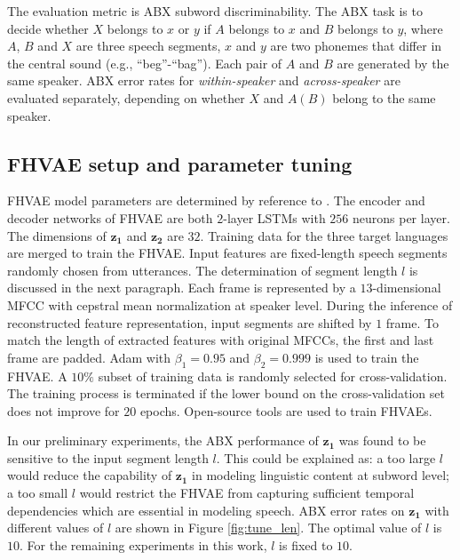 \documentclass[a4paper]{article}
\newcommand{\quotes}[1]{``#1''}
\begin{document}
The evaluation metric is ABX subword discriminability. The ABX task is to decide whether $X$ belongs to $x$ or $y$ if $A$ belongs to $x$ and $B$ belongs to $y$, where $A$, $B$ and $X$ are three speech segments, $x$ and $y$ are two phonemes that differ in the central sound (e.g., \quotes{beg}-\quotes{bag}). 
Each pair of $A$ and $B$ are generated by the same speaker. 
ABX error rates for \textit{within-speaker} and \textit{across-speaker} are evaluated separately, depending on whether $X$ and $A(B)$ belong to the same speaker. 
\subsection{FHVAE setup and parameter tuning}
FHVAE model parameters are determined by reference to  \cite{hsu2018extracting}. The  encoder and decoder networks of FHVAE are both $2$-layer LSTMs with $256$ neurons per layer. The dimensions of  $\bm{z_1}$ and $\bm{z_2}$ are $32$. 
Training data for the three target languages are merged to train the FHVAE. 
Input features  are fixed-length speech segments randomly chosen from utterances. The determination of segment length $l$ is discussed in the next paragraph. Each frame is represented by a $13$-dimensional MFCC with cepstral mean normalization at speaker level. 
During the inference of reconstructed feature representation, input segments are shifted by $1$ frame. To match the length of extracted features with original MFCCs, the first and last frame are padded. 
Adam \cite{kingma2014adam} with $\beta_1=0.95$ and $\beta_2=0.999$  is used to train the FHVAE. A $10\%$ subset of training data is randomly selected for cross-validation.
The training process is terminated if the lower bound on the cross-validation set does not improve for $20$ epochs. Open-source tools \cite{hsu2017nips} are used to train FHVAEs.

In our preliminary experiments, the ABX performance of $\bm{z_1}$ was found to be sensitive to the input segment length $l$. 
This could be explained as:  a too large  $l$ would reduce  the capability of $\bm{z_1}$ in modeling linguistic content at  subword level; 
a too small $l$ would restrict the FHVAE from capturing sufficient temporal dependencies which are essential in modeling speech.  ABX error rates on $\bm{z_1}$ with different values of $l$   are shown in Figure \ref{fig:tune_len}. 
The optimal value of $l$ is $10$. For the remaining experiments in this work, $l$ is fixed to $10$. 
\end{document}
